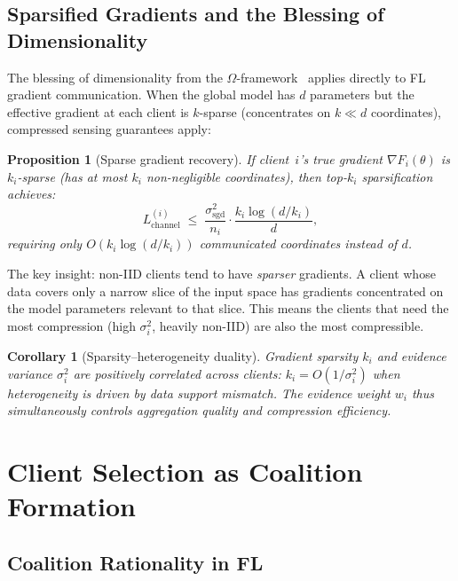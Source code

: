 \documentclass[11pt,a4paper]{article}
\newtheorem{proposition}[theorem]{Proposition}
\newtheorem{corollary}[theorem]{Corollary}
\begin{document}
\subsection{Sparsified Gradients and the Blessing of Dimensionality}

The blessing of dimensionality from the $\Omega$-framework~\cite{blessing2026}
applies directly to FL gradient communication. When the global model has
$d$ parameters but the effective gradient at each client is $k$-sparse
(concentrates on $k \ll d$ coordinates), compressed sensing guarantees
apply:

\begin{proposition}[Sparse gradient recovery]\label{prop:sparse-recovery}
If client~$i$'s true gradient $\nabla F_i(\theta)$ is $k_i$-sparse (has
at most $k_i$ non-negligible coordinates), then top-$k_i$ sparsification
achieves:
\begin{equation}\label{eq:sparse-rate}
  L_{\text{channel}}^{(i)} \;\leq\; \frac{\sigma_{\text{sgd}}^2}{n_i}
    \cdot \frac{k_i \log(d/k_i)}{d},
\end{equation}
requiring only $O(k_i \log(d/k_i))$ communicated coordinates instead of $d$.
\end{proposition}

The key insight: non-IID clients tend to have \emph{sparser} gradients.
A client whose data covers only a narrow slice of the input space has
gradients concentrated on the model parameters relevant to that slice.
This means the clients that need the most compression (high $\sigma_i^2$,
heavily non-IID) are also the most compressible.

\begin{corollary}[Sparsity--heterogeneity duality]
Gradient sparsity $k_i$ and evidence variance $\sigma_i^2$ are positively
correlated across clients: $k_i = O(1/\sigma_i^2)$ when heterogeneity
is driven by data support mismatch. The evidence weight $w_i$ thus
simultaneously controls aggregation quality and compression efficiency.
\end{corollary}


\section{Client Selection as Coalition Formation}
\label{sec:coalition}

\subsection{Coalition Rationality in FL}
\end{document}
